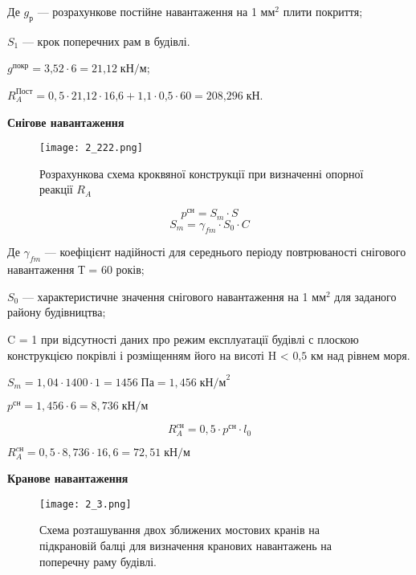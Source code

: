 \documentclass[a4paper,14pt]{article}
\begin{document}
Де  $g_{\textit{р}}$ --- розрахункове постійне навантаження на 1 м$м^{\textit{2}}$ плити покриття;

$S_1$ --- крок поперечних рам в будівлі.

$g^{\textit{покр}}={\textit{3,52}}\cdot 6 = {\textit{21,12}}\;\textit{кН/м}$;

$R^{\textit{Пост}}_A=0,5\cdot {\textit{21,12}}\cdot {\textit{16,6}}+ {\textit{1,1}}\cdot {\textit{0,5}}\cdot 60={\textit{208,296}}\;{\textit{кН}}$.

\textbf{Снігове навантаження}
\begin{figure}[h!]
    \begin{center}
        \texttt{[image: 2\_222.png]}
        \caption{Розрахункова схема кроквяної конструкції при визначенні
        опорної реакції $R_A$}\label{ris2_222} 
    \end{center}
\end{figure}
\begin{equation}
    p^{\textit{сн}}=S_{\textit{m}}\cdot S
\end{equation}
\begin{equation}
    S_m=\gamma_{fm}\cdot S_0 \cdot C
\end{equation}

Де $\gamma_{fm}$ --- коефіцієнт надійності для середнього періоду повтрюваності снігового навантаження Т = 60 років; 

$S_0$ --- характеристичне значення снігового навантаження на 1 м$м^{\textit{2}}$ для заданого району будівництва;

C = 1 при відсутності даних про режим експлуатації будівлі с плоскою конструкцією покрівлі і розміщенням його на висоті H < ${\textit{0,5}}$ км над рівнем моря.

$S_m=1,04\cdot 1400\cdot 1=1456\;\textit{Па}=1,456\;{\textit{кН/м}}^2$

$p^{\textit{сн}}=1,456\cdot 6=8,736\;\textit{кН/м}$

\begin{equation}
    R^{\textit{cн}}_A=0,5\cdot p^{\textit{сн}}\cdot l_0
\end{equation}

$R^{\textit{cн}}_A=0,5\cdot 8,736 \cdot 16,6 = 72,51\;\textit{кН/м}$

\textbf{Кранове навантаження}
\begin{figure}[h]
    \begin{center}
        \texttt{[image: 2\_3.png]}
        \caption{Схема розташування двох зближених мостових кранів на
        підкрановій балці для визначення кранових навантажень на поперечну раму
        будівлі.}\label{ris2_3} 
    \end{center}
\end{figure}
\end{document}
